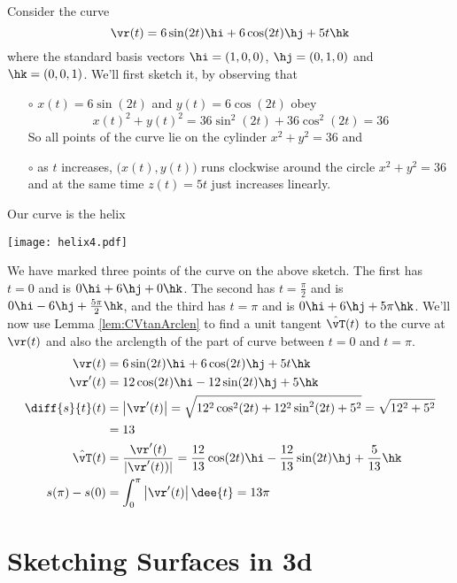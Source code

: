 \begin{eg}\label{eg:paramHelix}
Consider the curve
\begin{equation*}
\vr(t) = 6\sin(2t)\hi + 6\cos(2t)\hj +5t\hk
\end{equation*}
where the standard basis vectors $\hi = (1,0,0)$, $\hj=(0,1,0)$ 
and $\hk =(0,0,1)$.
We'll first sketch it, by observing that
\begin{itemize}\itemsep1pt \parskip0pt  %
\item[$\circ$] $x(t)=6\sin(2t)$ and $y(t) =6\cos(2t)$ obey
\begin{equation*}
x(t)^2+y(t)^2 = 36 \sin^2(2t) + 36\cos^2(2t) = 36
\end{equation*}
So all points of the curve lie on the cylinder $x^2+y^2=36$ and
\item[$\circ$] as $t$ increases, $\big(x(t),y(t)\big)$ runs clockwise 
around the circle $x^2+y^2=36$ and at the same time $z(t) = 5t$ 
just increases linearly.
\end{itemize}
Our curve is the helix
\begin{efig}
\begin{center}
     \texttt{[image: helix4.pdf]}
\end{center}
\end{efig}
We have marked three points of the curve on the above sketch. The first has
$t=0$ and is $0\hi+6\hj+0\hk$. The second has $t=\frac{\pi}{2}$ and is $0\hi-6\hj+\frac{5\pi}{2}\hk$, and the third has $t=\pi$ and is 
$0\hi+6\hj+5\pi\hk$.
We'll now use Lemma \ref{lem:CVtanArclen} to find a unit tangent
$\hat\vT(t)$ to the curve at $\vr(t)$ and also the arclength of the part of curve between $t=0$ and $t=\pi$.
\begin{align*}
\vr(t) &= 6\sin(2t)\hi + 6\cos(2t)\hj +5t\hk \\
\vr'(t) &= 12\cos(2t)\hi -12\sin(2t)\hj +5\hk \\
\diff{s}{t}(t)&=\big|\vr'(t)\big| 
=\sqrt{12^2\cos^2(2t) +12^2\sin^2(2t)+5^2}
= \sqrt{12^2+5^2}\\
& = 13\\
\hat\vT(t) &= \frac{\vr'(t)}{|\vr'(t))|}
               =  \frac{12}{13}\cos(2t)\hi -\frac{12}{13}\sin(2t)\hj +\frac{5}{13}\hk \\
s(\pi)-s(0)&= \int_{0}^\pi \big|\vr'(t)\big|\,\dee{t}
          =13\pi
\end{align*}
\end{eg}
\goodbreak

\section{Sketching Surfaces in 3d}\label{sec sketching}

